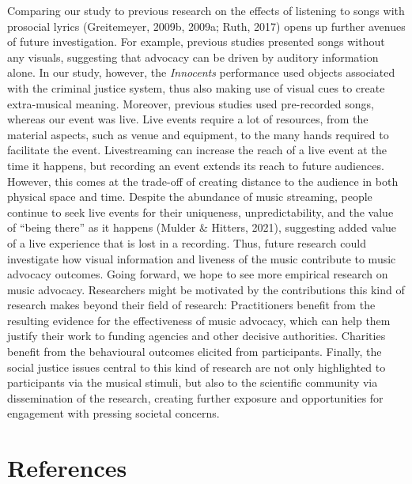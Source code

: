 \documentclass[
  man,floatsintext]{apa6}
\begin{document}
Comparing our study to previous research on the effects of listening to songs with prosocial lyrics (Greitemeyer, 2009b, 2009a; Ruth, 2017) opens up further avenues of future investigation. For example, previous studies presented songs without any visuals, suggesting that advocacy can be driven by auditory information alone. In our study, however, the \emph{Innocents} performance used objects associated with the criminal justice system, thus also making use of visual cues to create extra-musical meaning. Moreover, previous studies used pre-recorded songs, whereas our event was live. Live events require a lot of resources, from the material aspects, such as venue and equipment, to the many hands required to facilitate the event. Livestreaming can increase the reach of a live event at the time it happens, but recording an event extends its reach to future audiences. However, this comes at the trade-off of creating distance to the audience in both physical space and time. Despite the abundance of music streaming, people continue to seek live events for their uniqueness, unpredictability, and the value of ``being there'' as it happens (Mulder \& Hitters, 2021), suggesting added value of a live experience that is lost in a recording. Thus, future research could investigate how visual information and liveness of the music contribute to music advocacy outcomes. Going forward, we hope to see more empirical research on music advocacy. Researchers might be motivated by the contributions this kind of research makes beyond their field of research: Practitioners benefit from the resulting evidence for the effectiveness of music advocacy, which can help them justify their work to funding agencies and other decisive authorities. Charities benefit from the behavioural outcomes elicited from participants. Finally, the social justice issues central to this kind of research are not only highlighted to participants via the musical stimuli, but also to the scientific community via dissemination of the research, creating further exposure and opportunities for engagement with pressing societal concerns.

\newpage

\section{References}\label{references}
\end{document}
